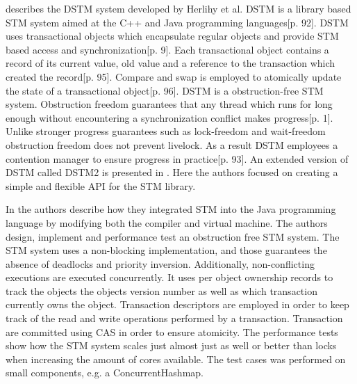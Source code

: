 \cite{herlihy2003software} describes the DSTM system developed by Herlihy et al. DSTM is a library based \ac{STM} system aimed at the C++ and Java programming languages\cite{herlihy2003software}[p. 92]. DSTM uses transactional objects which encapsulate regular objects and provide \ac{STM} based access and synchronization\cite{herlihy2003software}[p. 9]. Each transactional object contains a record of its current value, old value and a reference to the transaction which created the record\cite{herlihy2003software}[p. 95]. Compare and swap is employed to atomically update the state of a transactional object\cite{herlihy2003software}[p. 96]. DSTM is a obstruction-free\cite{herlihy2003obstruction} \ac{STM} system. Obstruction freedom guarantees that any thread which runs for long enough without encountering a synchronization conflict makes progress\cite{herlihy2003obstruction}[p. 1]. Unlike stronger progress guarantees such as lock-freedom and wait-freedom obstruction freedom does not prevent livelock. As a result DSTM employees a contention manager to ensure progress in practice\cite{herlihy2003software}[p. 93]. An extended version of DSTM called DSTM2 is presented in \cite{herlihy2006flexible}. Here the authors focused on creating a simple and flexible API for the \ac{STM} library.

In \cite{harris2003language} the authors describe how they integrated \ac{STM} into the Java programming language by modifying both the compiler\cite[p. 4]{harris2003language} and virtual machine\cite[p. 9]{harris2003language}. The authors design, implement and performance test an obstruction free \ac{STM} system. The \ac{STM} system uses a non-blocking implementation, and those guarantees the absence of deadlocks and priority inversion. Additionally, non-conflicting executions are executed concurrently. It uses per object ownership records to track the objects the objects version number as well as which transaction currently owns the object\cite[p. 6]{harris2003language}. Transaction descriptors are employed in order to keep track of the read and write operations performed by a transaction. Transaction are committed  using \ac{CAS} in order to ensure atomicity\cite[p. 7]{harris2003language}. The performance tests show how the \ac{STM} system scales just almost just as well or better than locks when increasing the amount of cores available\cite[p. 12]{harris2003language}. The test cases was performed on small components, e.g. a ConcurrentHashmap.

